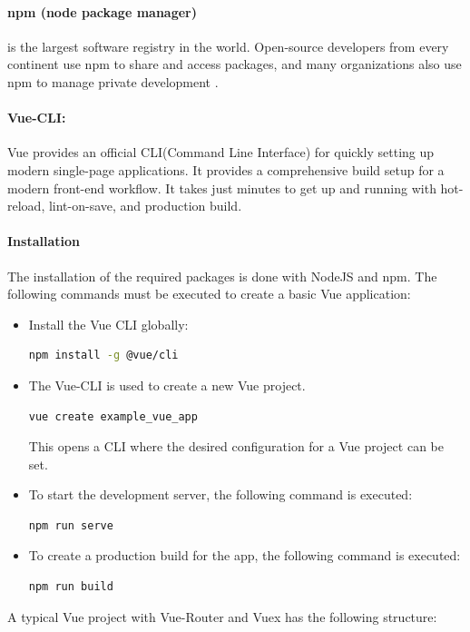 \paragraph{npm (node package manager)} is the largest software registry in the world. Open-source developers from every continent use npm to share and access packages, and many organizations also use npm to manage private development \cite{NPM:Online}.

\paragraph*{Vue-CLI:} Vue provides an official CLI(Command Line Interface) for quickly setting up modern single-page applications. It provides a comprehensive build setup for a modern front-end workflow. It takes just minutes to get up and running with hot-reload, lint-on-save, and production build.

\paragraph{Installation}
The installation of the required packages is done with NodeJS and npm. The following commands must be executed to create a basic Vue application:
\begin{itemize}
	\item Install the Vue CLI globally:
	\begin{lstlisting}[language=bash]
		npm install -g @vue/cli
	\end{lstlisting}
	\item The Vue-\gls{CLI} is used to create a new Vue project.
	\begin{lstlisting}[language=bash]
		vue create example_vue_app
	\end{lstlisting}
	This opens a CLI where the desired configuration for a Vue project can be set.
	\item To start the development server, the following command is executed:
	\begin{lstlisting}[language=bash]
		npm run serve
	\end{lstlisting}
	\item To create a production build for the app, the following command is executed:
	\begin{lstlisting}[language=bash]
		npm run build
	\end{lstlisting} 
\end{itemize} 


A typical Vue project with Vue-Router and Vuex has the following structure:

